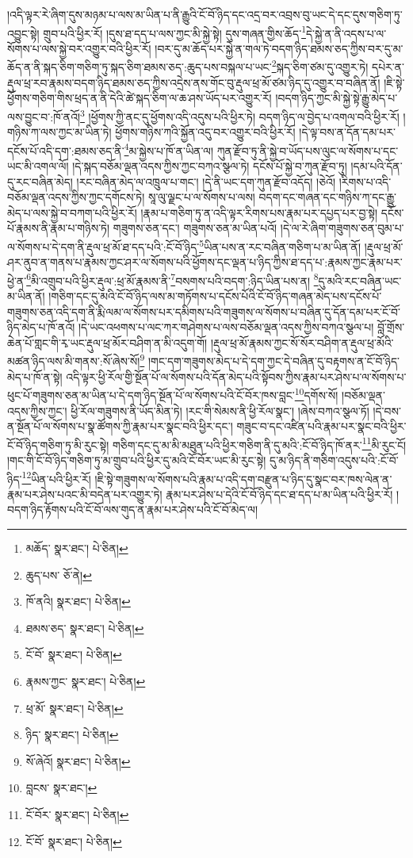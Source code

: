 །འདི་ལྟར་རེ་ཞིག་དུས་མཉམ་པ་ལས་མ་ཡིན་པ་ནི་རྒྱུའི་ངོ་བོ་ཉིད་དང་འདྲ་བར་འབྲས་བུ་ཡང་དེ་དང་དུས་གཅིག་ཏུ་འབྱུང་སྟེ། གྲུབ་པའི་ཕྱིར་རོ། །དུས་ཐ་དད་པ་ལས་ཀྱང་མི་སྐྱེ་སྟེ། དུས་གཞན་གྱིས་ཆོད་\footnote{མཆོད་  སྣར་ཐང་།  པེ་ཅིན། }དེ་སྐྱེ་ན་ནི་འདས་པ་ལ་སོགས་པ་ལས་སྐྱེ་བར་འགྱུར་བའི་ཕྱིར་རོ། །བར་དུ་མ་ཆོད་པར་སྐྱེ་ན་གལ་ཏེ་བདག་ཉིད་ཐམས་ཅད་ཀྱིས་བར་དུ་མ་ཆོད་ན་ནི་སྐད་ཅིག་གཅིག་ཏུ་སྐད་ཅིག་ཐམས་ཅད་:ཆུད་པས་བསྐལ་པ་ཡང་\footnote{ཆུད་པས་  ཅོ་ནེ། }སྐད་ཅིག་ཙམ་དུ་འགྱུར་ཏེ། དཔེར་ན་རྡུལ་ཕྲ་རབ་རྣམས་བདག་ཉིད་ཐམས་ཅད་ཀྱིས་འདྲེས་ནས་གོང་བུ་རྡུལ་ཕྲ་མོ་ཙམ་ཉིད་དུ་འགྱུར་བ་བཞིན་ནོ། །ཇི་སྟེ་ཕྱོགས་གཅིག་གིས་ཕྲད་ན་ནི་དེའི་ཚེ་སྐད་ཅིག་ལ་ཆ་ཤས་ཡོད་པར་འགྱུར་རོ། །བདག་ཉིད་ཀྱང་མི་སྐྱེ་སྟེ་རྒྱུ་མེད་པ་ལས་བྱུང་བ་:ཁོ་ནའོ།\footnote{ཁོ་ནའི།  སྣར་ཐང་།  པེ་ཅིན། } །ཕྱོགས་ཀྱི་ནང་དུ་ཕྱོགས་འདི་འདུས་པའི་ཕྱིར་ཏེ། བདག་ཉིད་ལ་བྱེད་པ་འགལ་བའི་ཕྱིར་རོ། །གཉིས་ཀ་ལས་ཀྱང་མ་ཡིན་ཏེ། ཕྱོགས་གཉིས་ཀའི་སྐྱོན་འདུ་བར་འགྱུར་བའི་ཕྱིར་རོ། །དེ་ལྟ་བས་ན་དོན་དམ་པར་དངོས་པོ་འདི་དག་:ཐམས་ཅད་ནི་\footnote{ཐམས་ཅད་  སྣར་ཐང་།  པེ་ཅིན། }མ་སྐྱེས་པ་ཁོ་ན་ཡིན་ལ། ཀུན་རྫོབ་ཏུ་ནི་སྐྱེ་བ་ཡོད་པས་ལུང་ལ་སོགས་པ་དང་ཡང་མི་འགལ་ལོ། །དེ་སྐད་བཅོམ་ལྡན་འདས་ཀྱིས་ཀྱང་བཀའ་སྩལ་ཏེ། དངོས་པོ་སྐྱེ་བ་ཀུན་རྫོབ་ཏུ། །དམ་པའི་དོན་དུ་རང་བཞིན་མེད། །རང་བཞིན་མེད་ལ་འཁྲུལ་པ་གང་། །དེ་ནི་ཡང་དག་ཀུན་རྫོབ་འདོད། །ཅེའོ། །རིགས་པ་འདི་བཅོམ་ལྡན་འདས་ཀྱིས་ཀྱང་དགོངས་ཏེ། སཱ་ལུ་ལྗང་པ་ལ་སོགས་པ་ལས། བདག་དང་གཞན་དང་གཉིས་ཀ་དང་རྒྱུ་མེད་པ་ལས་སྐྱེ་བ་བཀག་པའི་ཕྱིར་རོ། །རྣམ་པ་གཅིག་ཏུ་ན་འདི་ལྟར་རིགས་པས་རྣམ་པར་དཔྱད་པར་བྱ་སྟེ། དངོས་པོ་རྣམས་ནི་རྣམ་པ་གཉིས་ཏེ། གཟུགས་ཅན་དང་། གཟུགས་ཅན་མ་ཡིན་པའོ། །དེ་ལ་རེ་ཞིག་གཟུགས་ཅན་བུམ་པ་ལ་སོགས་པ་དེ་དག་ནི་རྡུལ་ཕྲ་མོ་ཐ་དད་པའི་:ངོ་བོ་ཉིད་\footnote{ངོ་བོ་  སྣར་ཐང་།  པེ་ཅིན། }ཡིན་པས་ན་རང་བཞིན་གཅིག་པ་མ་ཡིན་ནོ། །རྡུལ་ཕྲ་མོ་ཤར་ནུབ་ན་གནས་པ་རྣམས་ཀྱང་ཤར་ལ་སོགས་པའི་ཕྱོགས་དང་ལྡན་པ་ཉིད་ཀྱིས་ཐ་དད་པ་:རྣམས་ཀྱང་རྣམ་པར་ཕྱེ་ན་\footnote{རྣམས་ཀྱང་  སྣར་ཐང་།  པེ་ཅིན། }མི་འགྲུབ་པའི་ཕྱིར་རྡུལ་:ཕྲ་མོ་རྣམས་ནི་\footnote{ཕྲ་མོ་  སྣར་ཐང་།  པེ་ཅིན། }བསགས་པའི་བདག་:ཉིད་ཡིན་པས་ན། \footnote{ཉིད་  སྣར་ཐང་།  པེ་ཅིན། }དུ་མའི་རང་བཞིན་ཡང་མ་ཡིན་ནོ། །གཅིག་དང་དུ་མའི་ངོ་བོ་ཉིད་ལས་མ་གཏོགས་པ་དངོས་པོའི་ངོ་བོ་ཉིད་གཞན་མེད་པས་དངོས་པོ་གཟུགས་ཅན་འདི་དག་ནི་རྨི་ལམ་ལ་སོགས་པར་དམིགས་པའི་གཟུགས་ལ་སོགས་པ་བཞིན་དུ་དོན་དམ་པར་ངོ་བོ་ཉིད་མེད་པ་ཁོ་ནའོ། །དེ་ཡང་འཕགས་པ་ལང་ཀར་གཤེགས་པ་ལས་བཅོམ་ལྡན་འདས་ཀྱིས་བཀའ་སྩལ་པ། བློ་གྲོས་ཆེན་པོ་གླང་གི་རྭ་ཡང་རྡུལ་ཕྲ་མོར་བཤིག་ན་མི་འདུག་གོ། །རྡུལ་ཕྲ་མོ་རྣམས་ཀྱང་སོ་སོར་བཤིག་ན་རྡུལ་ཕྲ་མོའི་མཚན་ཉིད་ལས་མི་གནས་:སོ་ཞེས་སོ།\footnote{སོ་ཞེའོ།  སྣར་ཐང་།  པེ་ཅིན། } །གང་དག་གཟུགས་མེད་པ་དེ་དག་ཀྱང་དེ་བཞིན་དུ་བརྟགས་ན་ངོ་བོ་ཉིད་མེད་པ་ཁོ་ན་སྟེ། འདི་ལྟར་ཕྱི་རོལ་གྱི་སྔོན་པོ་ལ་སོགས་པའི་དོན་མེད་པའི་སྟོབས་ཀྱིས་རྣམ་པར་ཤེས་པ་ལ་སོགས་པ་ཕུང་པོ་གཟུགས་ཅན་མ་ཡིན་པ་དེ་དག་ཉིད་སྔོན་པོ་ལ་སོགས་པའི་ངོ་བོར་ཁས་བླང་\footnote{བླངས་  སྣར་ཐང་། }དགོས་སོ། །བཅོམ་ལྡན་འདས་ཀྱིས་ཀྱང་། ཕྱི་རོལ་གཟུགས་ནི་ཡོད་མིན་ཏེ། །རང་གི་སེམས་ནི་ཕྱི་རོལ་སྣང་། །ཞེས་བཀའ་སྩལ་ཏོ། །དེ་བས་ན་སྔོན་པོ་ལ་སོགས་པ་སྣ་ཚོགས་ཀྱི་རྣམ་པར་སྣང་བའི་ཕྱིར་དང་། གཟུང་བ་དང་འཛིན་པའི་རྣམ་པར་སྣང་བའི་ཕྱིར་ངོ་བོ་ཉིད་གཅིག་ཏུ་མི་རུང་སྟེ། གཅིག་དང་དུ་མ་མི་མཐུན་པའི་ཕྱིར་གཅིག་ནི་དུ་མའི་:ངོ་བོ་ཉིད་ཁོ་ནར་\footnote{ངོ་བོར་  སྣར་ཐང་།  པེ་ཅིན། }མི་རུང་ངོ། །གང་གི་ངོ་བོ་ཉིད་གཅིག་ཏུ་མ་གྲུབ་པའི་ཕྱིར་དུ་མའི་ངོ་བོར་ཡང་མི་རུང་སྟེ། དུ་མ་ཉིད་ནི་གཅིག་འདུས་པའི་:ངོ་བོ་ཉིད་\footnote{ངོ་བོ་  སྣར་ཐང་།  པེ་ཅིན། }ཡིན་པའི་ཕྱིར་རོ། །ཇི་སྟེ་གཟུགས་ལ་སོགས་པའི་རྣམ་པ་འདི་དག་བརྫུན་པ་ཉིད་དུ་སྣང་བར་ཁས་ལེན་ན་རྣམ་པར་ཤེས་པའང་མི་བདེན་པར་འགྱུར་ཏེ། རྣམ་པར་ཤེས་པ་དེའི་ངོ་བོ་ཉིད་དང་ཐ་དད་པ་མ་ཡིན་པའི་ཕྱིར་རོ། །བདག་ཉིད་རྟོགས་པའི་ངོ་བོ་ལས་གུད་ན་རྣམ་པར་ཤེས་པའི་ངོ་བོ་མེད་ལ། 